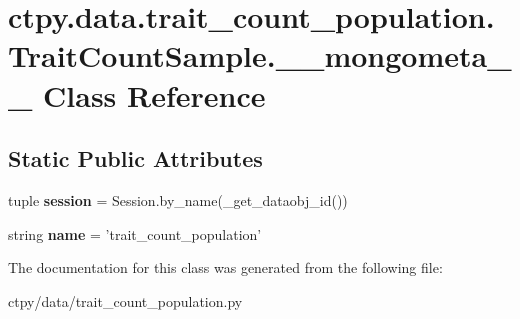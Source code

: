 \hypertarget{classctpy_1_1data_1_1trait__count__population_1_1_trait_count_sample_1_1____mongometa____}{\section{ctpy.\-data.\-trait\-\_\-count\-\_\-population.\-Trait\-Count\-Sample.\-\_\-\-\_\-mongometa\-\_\-\-\_\- Class Reference}
\label{classctpy_1_1data_1_1trait__count__population_1_1_trait_count_sample_1_1____mongometa____}
}
\subsection*{Static Public Attributes}
\begin{DoxyCompactItemize}
\item 
\hypertarget{classctpy_1_1data_1_1trait__count__population_1_1_trait_count_sample_1_1____mongometa_____a05696aaf00e6752d5b18311369399337}{tuple {\bfseries session} = Session.\-by\-\_\-name(\-\_\-get\-\_\-dataobj\-\_\-id())}\label{classctpy_1_1data_1_1trait__count__population_1_1_trait_count_sample_1_1____mongometa_____a05696aaf00e6752d5b18311369399337}

\item 
\hypertarget{classctpy_1_1data_1_1trait__count__population_1_1_trait_count_sample_1_1____mongometa_____aec9b37248d7f7fd9dca65792337c0399}{string {\bfseries name} = 'trait\-\_\-count\-\_\-population'}\label{classctpy_1_1data_1_1trait__count__population_1_1_trait_count_sample_1_1____mongometa_____aec9b37248d7f7fd9dca65792337c0399}

\end{DoxyCompactItemize}


The documentation for this class was generated from the following file\-:\begin{DoxyCompactItemize}
\item 
ctpy/data/trait\-\_\-count\-\_\-population.\-py\end{DoxyCompactItemize}
